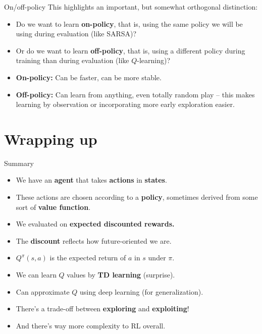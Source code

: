 \documentclass{beamer}
\begin{document}
\begin{frame}{On/off-policy}
This highlights an important, but somewhat orthogonal distinction: \vspace{-1.5em} 
\begin{itemize}
    \item<2-> Do we want to learn \textbf{on-policy}, that is, using the same policy we will be using during evaluation (like SARSA)?
    \item<3-> Or do we want to learn \textbf{off-policy}, that is, using a different policy during training than during evaluation (like \(Q\)-learning)?
\end{itemize}
\begin{itemize}
    \item<5-> \textbf{On-policy:} Can be faster, can be more stable. 
    \item<6-> \textbf{Off-policy:} Can learn from anything, even totally random play -- this makes learning by observation or incorporating more early exploration easier.
\end{itemize}
\end{frame}

\section{Wrapping up}

\begin{frame}{Summary}
\begin{itemize}
\item We have an \textbf{agent} that takes \textbf{actions} in \textbf{states}. 
\item<2-> These actions are chosen according to a \textbf{policy}, sometimes derived from some sort of \textbf{value function}. 
\item<3-> We evaluated on \textbf{expected discounted rewards.}
\item<4-> The \textbf{discount} reflects how future-oriented we are.
\item<5-> \(Q^\pi(s,a)\) is the expected return of \(a\) in \(s\) under \(\pi\).
\item<6-> We can learn \(Q\) values by \textbf{TD learning} (surprise).
\item<7-> Can approximate \(Q\) using deep learning (for generalization). 
\item<8-> There's a trade-off between \textbf{exploring} and \textbf{exploiting}!
\item<9-> And there's way more complexity to RL overall.
\end{itemize}
\end{frame}
\end{document}
